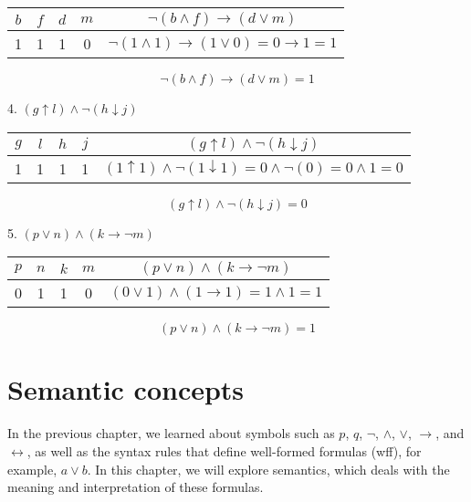 \documentclass[12pt,a4paper,openany]{article}
\begin{document}
\begin{center}
\begin{tabular}{|c|c|c|c||c|}
\hline
$b$ & $f$ & $d$ & $m$ & $\neg(b \land f) \to (d \lor m)$ \\
\hline
1 & 1 & 1 & 0 & $\neg(1 \land 1) \to (1 \lor 0) = 0 \to 1 = 1$ \\
\hline
\end{tabular}
\end{center}

\[
\boxed{\neg(b \land f) \to (d \lor m) = 1}
\]



{4. } $(g \uparrow l) \land \neg(h \downarrow j)$

\begin{center}
\begin{tabular}{|c|c|c|c||c|}
\hline
$g$ & $l$ & $h$ & $j$ & $(g \uparrow l) \land \neg(h \downarrow j)$ \\
\hline
1 & 1 & 1 & 1 & $(1 \uparrow 1) \land \neg(1 \downarrow 1) = 0 \land \neg(0) = 0 \land 1 = 0$ \\
\hline
\end{tabular}
\end{center}

\[
\boxed{(g \uparrow l) \land \neg(h \downarrow j) = 0}
\]



{5. } $(p \lor n) \land (k \to \neg m)$

\begin{center}
\begin{tabular}{|c|c|c|c||c|}
\hline
$p$ & $n$ & $k$ & $m$ & $(p \lor n) \land (k \to \neg m)$ \\
\hline
0 & 1 & 1 & 0 & $(0 \lor 1) \land (1 \to 1) = 1 \land 1 = 1$ \\
\hline
\end{tabular}
\end{center}

\[
\boxed{(p \lor n) \land (k \to \neg m) = 1}
\]


\section{Semantic concepts }

In the previous chapter, we learned about symbols such as \(p\), \(q\),
\(\neg\), \(\land\), \(\lor\), \(\to\), and \(\leftrightarrow\), as well
as the syntax rules that define well-formed formulas (wff), for example,
\(a \lor b\). In this chapter, we will explore semantics, which deals
with the meaning and interpretation of these formulas.
\end{document}
